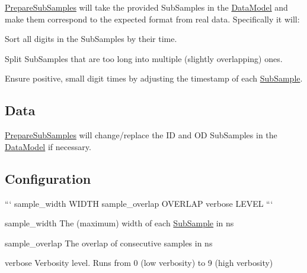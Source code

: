 \hyperlink{classPrepareSubSamples}{Prepare\-Sub\-Samples} will take the provided Sub\-Samples in the \hyperlink{classDataModel}{Data\-Model} and make them correspond to the expected format from real data. Specifically it will\-:


\begin{DoxyEnumerate}
\item Sort all digits in the Sub\-Samples by their time.
\item Split Sub\-Samples that are too long into multiple (slightly overlapping) ones.
\item Ensure positive, small digit times by adjusting the timestamp of each \hyperlink{classSubSample}{Sub\-Sample}.
\end{DoxyEnumerate}

\subsection*{Data}

\hyperlink{classPrepareSubSamples}{Prepare\-Sub\-Samples} will change/replace the I\-D and O\-D Sub\-Samples in the \hyperlink{classDataModel}{Data\-Model} if necessary.

\subsection*{Configuration}

``` sample\-\_\-width W\-I\-D\-T\-H sample\-\_\-overlap O\-V\-E\-R\-L\-A\-P verbose L\-E\-V\-E\-L ```


\begin{DoxyItemize}
\item {\ttfamily sample\-\_\-width} The (maximum) width of each \hyperlink{classSubSample}{Sub\-Sample} in ns
\item {\ttfamily sample\-\_\-overlap} The overlap of consecutive samples in ns
\item {\ttfamily verbose} Verbosity level. Runs from 0 (low verbosity) to 9 (high verbosity) 
\end{DoxyItemize}